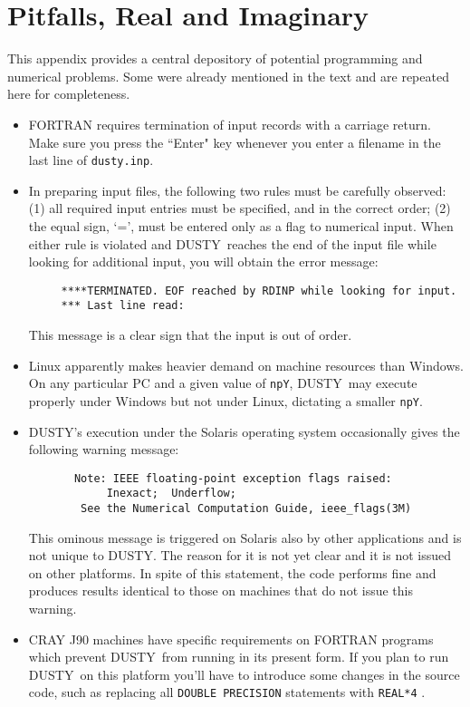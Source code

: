 \documentclass[12pt]{article} \usepackage{epsf}
\def\Section#1{\section{\sc #1}}
\def\D  {{\sf DUSTY}}
\begin{document}
\Section{Pitfalls, Real and Imaginary} \label{pitfalls}

This appendix provides a central depository of potential programming and
numerical problems. Some were already mentioned in the text and are repeated
here for completeness.

\begin{itemize}
\item
FORTRAN requires termination of input records with a carriage return. Make sure
you press the ``Enter" key whenever you enter a filename in the last line of
{\tt dusty.inp}.

\item
In preparing input files, the following two rules must be carefully observed:
(1) all required input entries must be specified, and in the correct order; (2)
the equal sign, `=', must be entered only as a flag to numerical input. When
either rule is violated and \D\ reaches the end of the input file while looking
for additional input, you will obtain the error message:
\begin{verbatim}
     ****TERMINATED. EOF reached by RDINP while looking for input.
     *** Last line read:
\end{verbatim}
This message is a clear sign that the input is out of order.

\item
Linux apparently makes heavier demand on machine resources than Windows.  On
any particular PC and a given value of {\tt npY}, \D\ may execute properly
under Windows but not under Linux, dictating a smaller {\tt npY}.

\item
\D's execution under the Solaris operating system occasionally gives the
following warning message:
\begin{verbatim}
       Note: IEEE floating-point exception flags raised:
            Inexact;  Underflow;
        See the Numerical Computation Guide, ieee_flags(3M)
\end{verbatim}
This ominous message is triggered on Solaris also by other applications and is
not unique to \D. The reason for it is not yet clear and it is not issued on
other platforms. In spite of this statement, the code performs fine and
produces results identical to those on machines that do not issue this warning.

\item
CRAY J90 machines have specific requirements on FORTRAN programs which prevent
\D\ from running in its present form.  If you plan to run \D\ on this platform
you'll have to introduce some changes in the source code, such as replacing all
{\tt DOUBLE PRECISION} statements with {\tt REAL*4} .

\end{itemize}
\end{document}

